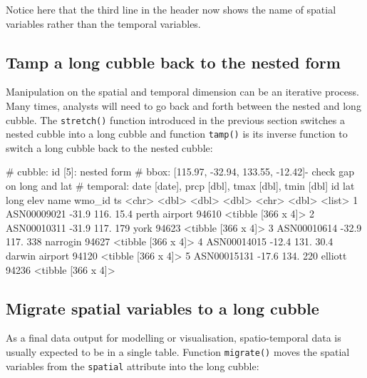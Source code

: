 \documentclass[
]{jss}
\begin{document}
Notice here that the third line in the header now shows the name of
spatial variables rather than the temporal variables.

\hypertarget{tamp-a-long-cubble-back-to-the-nested-form}{%
\subsection{Tamp a long cubble back to the nested
form}\label{tamp-a-long-cubble-back-to-the-nested-form}}

Manipulation on the spatial and temporal dimension can be an iterative
process. Many times, analysts will need to go back and forth between the
nested and long cubble. The \texttt{stretch()} function introduced in
the previous section switches a nested cubble into a long cubble and
function \texttt{tamp()} is its inverse function to switch a long cubble
back to the nested cubble:

\begin{CodeChunk}
\begin{CodeOutput}
# cubble:   id [5]: nested form
# bbox:     [115.97, -32.94, 133.55, -12.42]- check gap on long and lat
# temporal: date [date], prcp [dbl], tmax [dbl], tmin [dbl]
  id            lat  long  elev name           wmo_id ts                
  <chr>       <dbl> <dbl> <dbl> <chr>           <dbl> <list>            
1 ASN00009021 -31.9  116.  15.4 perth airport   94610 <tibble [366 x 4]>
2 ASN00010311 -31.9  117. 179   york            94623 <tibble [366 x 4]>
3 ASN00010614 -32.9  117. 338   narrogin        94627 <tibble [366 x 4]>
4 ASN00014015 -12.4  131.  30.4 darwin airport  94120 <tibble [366 x 4]>
5 ASN00015131 -17.6  134. 220   elliott         94236 <tibble [366 x 4]>
\end{CodeOutput}
\end{CodeChunk}

\hypertarget{migrate-spatial-variables-to-a-long-cubble}{%
\subsection{Migrate spatial variables to a long
cubble}\label{migrate-spatial-variables-to-a-long-cubble}}

As a final data output for modelling or visualisation, spatio-temporal
data is usually expected to be in a single table. Function
\texttt{migrate()} moves the spatial variables from the \texttt{spatial}
attribute into the long cubble:
\end{document}
